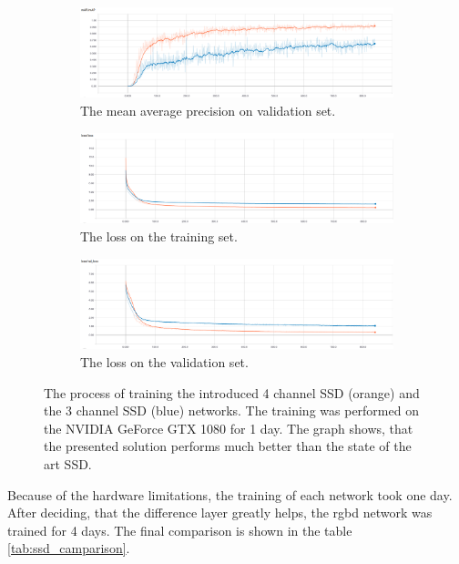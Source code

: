 \documentclass[a4paper,12pt,titlepage]{article}
\numberwithin{figure}{section}
\begin{document}
\begin{figure}[H]
    \begin{subfigure}[Sample1]{1\linewidth} 
    	\includegraphics[width=1\linewidth]{fig/ssd_compare/mAP.png}
        \caption{The mean average precision on validation set.}   
        \label{fig:ssd_mAP}
    \end{subfigure}
    \begin{subfigure}[Sample1]{1\linewidth} 
    	\includegraphics[width=1\linewidth]{fig/ssd_compare/loss.png}
        \caption{The loss on the training set.}   
        \label{fig:ssd_loss}
    \end{subfigure}    
	\begin{subfigure}[Sample1]{1\linewidth} 
    	\includegraphics[width=1\linewidth]{fig/ssd_compare/val_loss.png}
        \caption{The loss on the validation set.}   
        \label{fig:ssd_val_loss}
    \end{subfigure}    
    \caption{The process of training the introduced 4 channel SSD (orange) and the 3 channel SSD (blue) networks. The training was performed on the NVIDIA GeForce GTX 1080 for 1 day. The graph shows, that the presented solution performs much better than the state of the art SSD.}
    \label{fig:ssd_training}
\end{figure}

Because of the hardware limitations, the training of each network took one day. After deciding, that the difference layer greatly helps, the rgbd network was trained for 4 days. The final comparison is shown in the table \ref{tab:ssd_camparison}.
\end{document}
